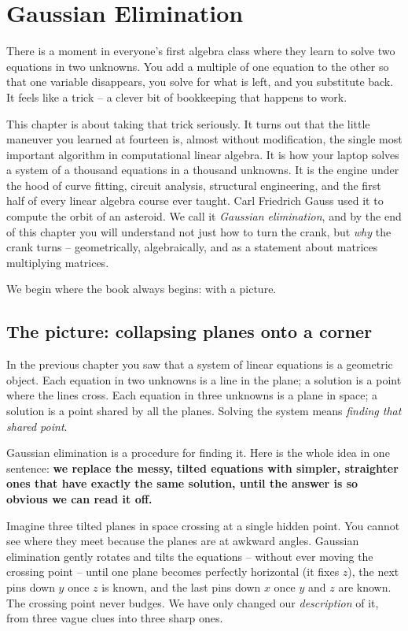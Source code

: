 \chapter{Gaussian Elimination}

There is a moment in everyone's first algebra class where they learn to solve
two equations in two unknowns. You add a multiple of one equation to the other
so that one variable disappears, you solve for what is left, and you substitute
back. It feels like a trick -- a clever bit of bookkeeping that happens to work.

This chapter is about taking that trick seriously. It turns out that the little
maneuver you learned at fourteen is, almost without modification, the single
most important algorithm in computational linear algebra. It is how your laptop
solves a system of a thousand equations in a thousand unknowns. It is the engine
under the hood of curve fitting, circuit analysis, structural engineering, and
the first half of every linear algebra course ever taught. Carl Friedrich Gauss
used it to compute the orbit of an asteroid. We call it \emph{Gaussian
elimination}, and by the end of this chapter you will understand not just how to
turn the crank, but \emph{why} the crank turns -- geometrically, algebraically,
and as a statement about matrices multiplying matrices.

We begin where the book always begins: with a picture.

\section{The picture: collapsing planes onto a corner}

In the previous chapter you saw that a system of linear equations is a geometric
object. Each equation in two unknowns is a line in the plane; a solution is a
point where the lines cross. Each equation in three unknowns is a plane in
space; a solution is a point shared by all the planes. Solving the system means
\emph{finding that shared point}.

Gaussian elimination is a procedure for finding it. Here is the whole idea in
one sentence: \textbf{we replace the messy, tilted equations with simpler,
straighter ones that have exactly the same solution, until the answer is so
obvious we can read it off.}

\begin{intuitionbox}
Imagine three tilted planes in space crossing at a single hidden point. You
cannot see where they meet because the planes are at awkward angles. Gaussian
elimination gently rotates and tilts the equations -- without ever moving the
crossing point -- until one plane becomes perfectly horizontal (it fixes $z$),
the next pins down $y$ once $z$ is known, and the last pins down $x$ once $y$ and
$z$ are known. The crossing point never budges. We have only changed our
\emph{description} of it, from three vague clues into three sharp ones.
\end{intuitionbox}

